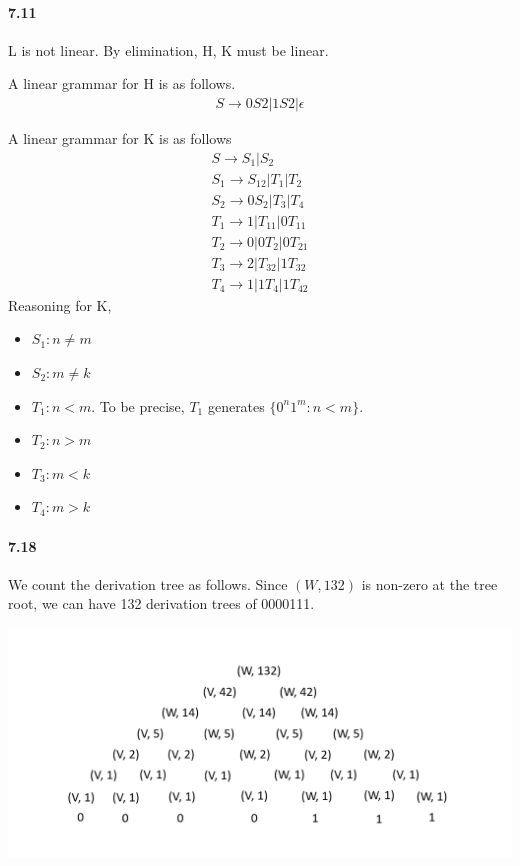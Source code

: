 \documentclass{article}
\begin{document}
\paragraph{7.11}
L is not linear. By elimination, H, K must be linear.

A linear grammar for H is as follows.
\begin{align*}
	S \rightarrow 0S2 | 1S2 | \epsilon
\end{align*}

A linear grammar for K is as follows
\begin{align*}
	S \rightarrow S_1 | S_2\\
	S_1\rightarrow S_12 | T_1 | T_2\\
	S_2\rightarrow 0S_2 | T_3 | T_4\\
	T_1\rightarrow 1 | T_11 | 0T_11\\
	T_2\rightarrow 0 | 0T_2 | 0T_21\\
	T_3\rightarrow 2 | T_32 | 1T_32\\
	T_4\rightarrow 1 | 1T_4 | 1T_42
\end{align*}
Reasoning for K, 
\begin{itemize}
	\item $S_1: n\neq m$
	\item $S_2: m\neq k$
	\item $T_1: n<m$. To be precise, $T_1$ generates $\{0^n1^m:n<m\}$.
	\item $T_2: n>m$
	\item $T_3: m<k$
	\item $T_4: m>k$
\end{itemize}




\paragraph{7.18} We count the derivation tree as follows. Since $(W,132)$ is non-zero at the tree root, we can have 132 derivation trees of 0000111.

\includegraphics[scale=0.7]{qn7_18}
\end{document}
